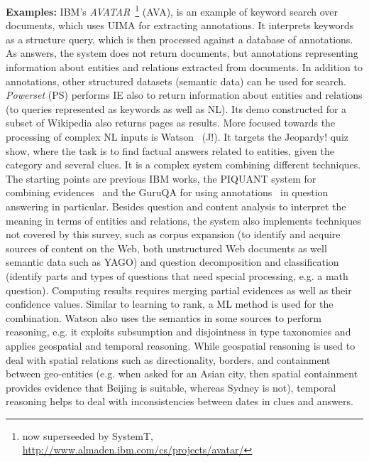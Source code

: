 \textbf{Examples:}
IBM's \emph{AVATAR}~\footnote{now superseeded by SystemT, \url{http://www.almaden.ibm.com/cs/projects/avatar/}} (AVA), is an example of keyword search over documents, which uses UIMA for extracting annotations. It interprets keywords as a structure query, which is then processed against a database of annotations. As answers, the system does not return documents, but annotations representing information about entities and relations extracted from documents. In addition to annotations, other structured datasets (semantic data) can be used for search. \emph{Powerset} (PS) performs IE also to return information about entities and relations (to queries represented as keywords as well as NL). Its demo constructed for a subset of Wikipedia also returns pages as results. More focused towards the processing of complex NL inputs is Watson~\cite{DBLP:journals/aim/FerrucciBCFGKLMNPSW10} (J!). It targets the Jeopardy! quiz show, where the task is to find factual answers related to entities, given the category and several clues. It is a complex system combining different techniques. The starting points are previous IBM works, the PIQUANT system for combining evidences~\cite{DBLP:conf/naacl/Chu-CarrollCPI03} and the GuruQA for using annotations~\cite{DBLP:conf/sigir/PragerBCR00,DBLP:conf/sigir/Chu-CarrollPCFD06} in question answering in particular. Besides question and content analysis to interpret the meaning in terms of entities and relations, the system also implements techniques not covered by this survey, such as corpus expansion (to identify and acquire sources of content on the Web, both unstructured Web documents as well semantic data such as YAGO) and question decomposition and classification (identify parts and types of questions that need special processing, e.g. a math question). Computing results requires merging partial evidences as well as their confidence values. Similar to learning to rank, a ML method is used for the combination. Watson also uses the semantics in some sources to perform reasoning, e.g. it exploits subsumption and
disjointness in type taxonomies and applies geospatial and
temporal reasoning. While geospatial reasoning is used
to deal with spatial
relations such as directionality, borders, and
containment between geo-entities (e.g. when asked for an Asian city, then spatial containment
provides evidence that Beijing is suitable, whereas Sydney is not), temporal reasoning helps to deal with 
inconsistencies between dates in clues and answers. 


